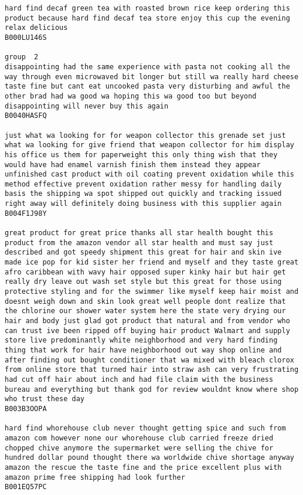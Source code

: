 \documentclass[11pt]{article}
\begin{document}
\begin{Verbatim}[commandchars=\\\{\}]
hard find decaf green tea with roasted brown rice keep ordering this product because hard find decaf tea store enjoy this cup the evening relax delicious
B000LU146S

group  2
disappointing had the same experience with pasta not cooking all the way through even microwaved bit longer but still wa really hard cheese taste fine but cant eat uncooked pasta very disturbing and awful the other brad had wa good wa hoping this wa good too but beyond disappointing will never buy this again
B0040HASFQ

just what wa looking for for weapon collector this grenade set just what wa looking for give friend that weapon collector for him display his office us them for paperweight this only thing wish that they would have had enamel varnish finish them instead they appear unfinished cast product with oil coating prevent oxidation while this method effective prevent oxidation rather messy for handling daily basis the shipping wa spot shipped out quickly and tracking issued right away will definitely doing business with this supplier again
B004F1J98Y

great product for great price thanks all star health bought this product from the amazon vendor all star health and must say just described and got speedy shipment this great for hair and skin ive made ice pop for kid sister her friend and myself and they taste great afro caribbean with wavy hair opposed super kinky hair but hair get really dry leave out wash set style but this great for those using protective styling and for the swimmer like myself keep hair moist and doesnt weigh down and skin look great well people dont realize that the chlorine our shower water system here the state very drying our hair and body just glad got product that natural and from vendor who can trust ive been ripped off buying hair product Walmart and supply store live predominantly white neighborhood and very hard finding thing that work for hair have neighborhood out way shop online and after finding out bought conditioner that wa mixed with bleach clorox from online store that turned hair into straw ash can very frustrating had cut off hair about inch and had file claim with the business bureau and everything but thank god for review wouldnt know where shop who trust these day
B003B3OOPA

hard find whorehouse club never thought getting spice and such from amazon com however none our whorehouse club carried freeze dried chopped chive anymore the supermarket were selling the chive for hundred dollar pound thought there wa worldwide chive shortage anyway amazon the rescue the taste fine and the price excellent plus with amazon prime free shipping had look further
B001EQ57PC


\end{Verbatim}
\end{document}
